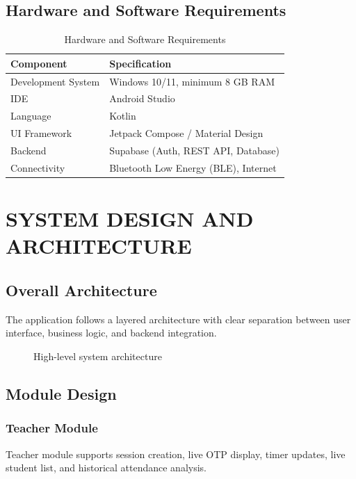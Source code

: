 \documentclass[12pt,a4paper]{report}
\begin{document}
\section{Hardware and Software Requirements}
\begin{table}[H]
\centering
\caption{Hardware and Software Requirements}
\begin{tabular}{p{}p{}}
\toprule
\textbf{Component} & \textbf{Specification} \\
\midrule
Development System & Windows 10/11, minimum 8 GB RAM \\
IDE & Android Studio \\
Language & Kotlin \\
UI Framework & Jetpack Compose / Material Design \\
Backend & Supabase (Auth, REST API, Database) \\
Connectivity & Bluetooth Low Energy (BLE), Internet \\
\bottomrule
\end{tabular}
\end{table}

\chapter{SYSTEM DESIGN AND ARCHITECTURE}
\section{Overall Architecture}
The application follows a layered architecture with clear separation between user interface, business logic, and backend integration.

\begin{figure}[H]
\centering
{}
\caption{High-level system architecture}
\end{figure}

\section{Module Design}
\subsection{Teacher Module}
Teacher module supports session creation, live OTP display, timer updates, live student list, and historical attendance analysis.
\end{document}
